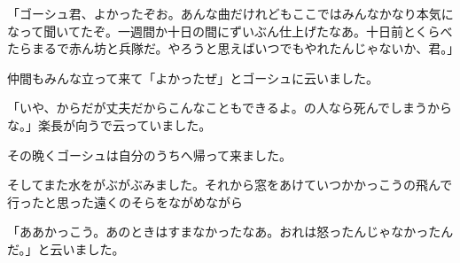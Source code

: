 \documentclass[uplatex,a5paper,twoside]{jsarticle}
\begin{document}
「ゴーシュ君、よかったぞお。あんな曲だけれどもここではみんなかなり本気になって聞いてたぞ。一週間か十日の間にずいぶん仕上げたなあ。十日前とくらべたらまるで赤ん坊と兵隊だ。やろうと思えばいつでもやれたんじゃないか、君。」

仲間もみんな立って来て「よかったぜ」とゴーシュに云いました。

「いや、からだが丈夫だからこんなこともできるよ。の人なら死んでしまうからな。」楽長が向うで云っていました。

その晩くゴーシュは自分のうちへ帰って来ました。

そしてまた水をがぶがぶみました。それから窓をあけていつかかっこうの飛んで行ったと思った遠くのそらをながめながら

「ああかっこう。あのときはすまなかったなあ。おれは怒ったんじゃなかったんだ。」と云いました。
\end{document}
